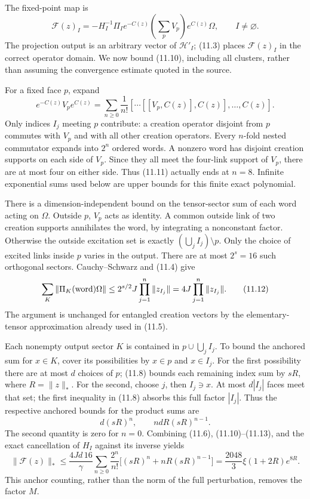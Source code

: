 \documentclass[
]{article}
\begin{document}
The fixed-point map is \[
\mathcal F(z)_I=-H_I^{-1}\Pi_I
  e^{-C(z)}\left(\sum_pV_p\right)e^{C(z)}\Omega,
       \qquad I\ne\varnothing.                              \tag{11.10}
\] The projection output is an arbitrary vector of \(\mathcal H'_I\);
(11.3) places \(\mathcal F(z)_I\) in the correct operator domain. We now
bound (11.10), including all clusters, rather than assuming the
convergence estimate quoted in the source.

For a fixed face \(p\), expand \[
e^{-C(z)}V_pe^{C(z)}
 =\sum_{n\ge0}\frac1{n!}
    [\cdots[[V_p,C(z)],C(z)],\ldots,C(z)].
                                                               \tag{11.11}
\] Only indices \(I_j\) meeting \(p\) contribute: a creation operator
disjoint from \(p\) commutes with \(V_p\) and with all other creation
operators. Every \(n\)-fold nested commutator expands into \(2^n\)
ordered words. A nonzero word has disjoint creation supports on each
side of \(V_p\). Since they all meet the four-link support of \(V_p\),
there are at most four on either side. Thus (11.11) actually ends at
\(n=8\). Infinite exponential sums used below are upper bounds for this
finite exact polynomial.

There is a dimension-independent bound on the tensor-sector sum of each
word acting on \(\Omega\). Outside \(p\), \(V_p\) acts as identity. A
common outside link of two creation supports annihilates the word, by
integrating a nonconstant factor. Otherwise the outside excitation set
is exactly \((\bigcup_jI_j)\setminus p\). Only the choice of excited
links inside \(p\) varies in the output. There are at most \(2^s=16\)
such orthogonal sectors. Cauchy--Schwarz and (11.4) give \[
\sum_K\|\Pi_K(\hbox{word})\Omega\|
 \le2^{s/2}J\prod_{j=1}^n\|z_{I_j}\|
 =4J\prod_{j=1}^n\|z_{I_j}\|.                                \tag{11.12}
\] The argument is unchanged for entangled creation vectors by the
elementary-tensor approximation already used in (11.5).

Each nonempty output sector \(K\) is contained in \(p\cup\bigcup_jI_j\).
To bound the anchored sum for \(x\in K\), cover its possibilities by
\(x\in p\) and \(x\in I_j\). For the first possibility there are at most
\(d\) choices of \(p\); (11.8) bounds each remaining index sum by
\(sR\), where \(R=\|z\|_*\). For the second, choose \(j\), then
\(I_j\ni x\). At most \(d|I_j|\) faces meet that set; the first
inequality in (11.8) absorbs this full factor \(|I_j|\). Thus the
respective anchored bounds for the product sums are \[
d(sR)^n,\qquad ndR(sR)^{n-1}.                                \tag{11.13}
\] The second quantity is zero for \(n=0\). Combining (11.6),
(11.10)--(11.13), and the exact cancellation of \(H_I\) against its
inverse yields \[
\|\mathcal F(z)\|_*
\le\frac{4Jd\,16}{\gamma}
 \sum_{n\ge0}\frac{2^n}{n!}
       \bigl[(sR)^n+nR(sR)^{n-1}\bigr]
=\frac{2048}{3}\xi(1+2R)e^{8R}.                              \tag{11.14}
\] This anchor counting, rather than the norm of the full perturbation,
removes the factor \(M\).
\end{document}
